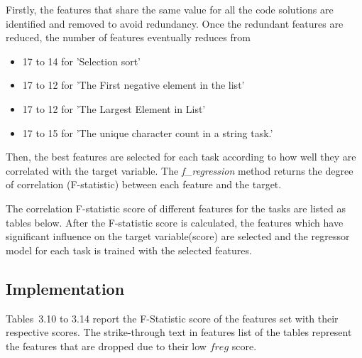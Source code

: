 Firstly, the features that share the same value for all the
code solutions are identified and removed to avoid
redundancy. Once the redundant features are reduced, the
number of features eventually reduces from
\begin{itemize}
\item 17 to 14 for 'Selection sort'
\item 17 to 12 for 'The First negative element in the list'
\item 17 to 12 for 'The Largest Element in List'
\item 17 to 15 for 'The unique character count in a string
  task.'
\end{itemize}
Then, the best features are selected for each task according
to how well they are correlated with the target variable. The
\emph{f\_regression} method \cite{H} returns the degree of
correlation (F-statistic) between each feature and the
target.

The correlation F-statistic score of different features for
the tasks are listed as tables below. After the F-statistic
score is calculated, the features which have significant
influence on the target variable(score) are selected and the
regressor model for each task is trained with the selected
features.

\subsection{Implementation}

Tables~3.10 to 3.14 report the F-Statistic score of the
features set with their respective scores. The strike-through
text in features list of the tables represent the features
that are dropped due to their low $f{reg}$ score.

